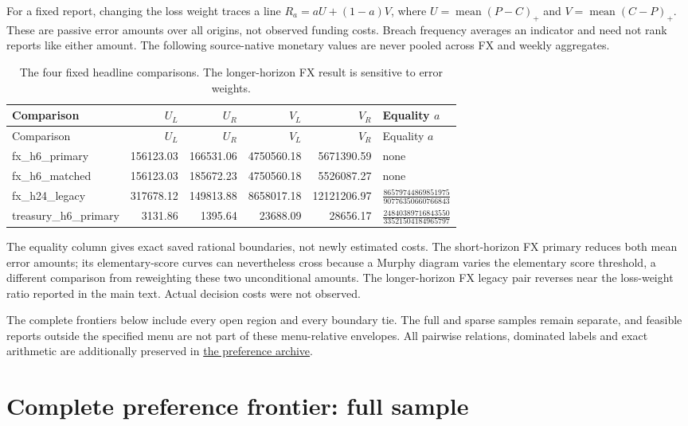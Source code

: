 \documentclass[11pt,a4paper]{article}
\begin{document}
For a fixed report, changing the loss weight traces a line
\(R_a=aU+(1-a)V\), where \(U=\operatorname{mean}(P-C)_+\) and
\(V=\operatorname{mean}(C-P)_+\). These are passive error amounts over all
origins, not observed funding costs. Breach frequency averages an indicator and
need not rank reports like either amount. The following source-native monetary
values are never pooled across FX and weekly aggregates.
\begingroup
\scriptsize
\setlength{\tabcolsep}{3pt}
\renewcommand{\arraystretch}{1.12}
\begin{longtable}{p{30mm}rrrrp{32mm}}
\caption{The four fixed headline comparisons. The longer-horizon FX result is sensitive to error weights.}\\
\toprule
Comparison & \(U_L\) & \(U_R\) & \(V_L\) & \(V_R\) & Equality \(a\) \\
\midrule
\endfirsthead
\toprule
Comparison & \(U_L\) & \(U_R\) & \(V_L\) & \(V_R\) & Equality \(a\) \\
\midrule
\endhead
\bottomrule
\endfoot
fx\_h6\_primary & 156123.03 & 166531.06 & 4750560.18 & 5671390.59 & none \\
fx\_h6\_matched & 156123.03 & 185672.23 & 4750560.18 & 5526087.27 & none \\
fx\_h24\_legacy & 317678.12 & 149813.88 & 8658017.18 & 12121206.97 & \(\frac{86579744869851975}{90776350660766843}\) \\
treasury\_h6\_primary & 3131.86 & 1395.64 & 23688.09 & 28656.17 & \(\frac{24840389716843550}{33521504184965797}\) \\
\end{longtable}
\endgroup

The equality column gives exact saved rational boundaries, not newly
estimated costs. The short-horizon FX primary reduces both mean error amounts;
its elementary-score curves can nevertheless cross because a Murphy diagram
varies the elementary score threshold, a different comparison from reweighting
these two unconditional amounts. The longer-horizon FX legacy pair reverses
near the loss-weight ratio reported in the main text. Actual decision costs
were not observed.

The complete frontiers below include every open region and every boundary tie.
The full and sparse samples remain separate, and feasible reports outside the
specified menu are not part of these menu-relative envelopes. All pairwise
relations, dominated labels and exact arithmetic are additionally preserved in
\href{https://github.com/ByronLi0207/financial-mathematics-paper-20261020/blob/revision-v7-final/results/revision-20261022/preference-robustness/README.md}{the preference archive}.\section{Complete preference frontier: full sample}\label{sup:frontier-0}
\end{document}
